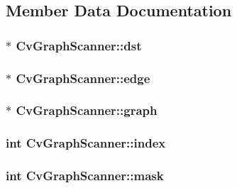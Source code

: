 \subsection{Member Data Documentation}
\hypertarget{structCvGraphScanner_a91bef0ef47bc1f5639bcdf78249633d9}{
\subsubsection[{dst}]{$\ast$ Cv\-Graph\-Scanner\-::dst}}\label{structCvGraphScanner_a91bef0ef47bc1f5639bcdf78249633d9}
\hypertarget{structCvGraphScanner_ab1dda30fae2447a8302717d1ba59cf39}{
\subsubsection[{edge}]{$\ast$ Cv\-Graph\-Scanner\-::edge}}\label{structCvGraphScanner_ab1dda30fae2447a8302717d1ba59cf39}
\hypertarget{structCvGraphScanner_a092119864e858db9dbb77816ded7e436}{
\subsubsection[{graph}]{$\ast$ Cv\-Graph\-Scanner\-::graph}}\label{structCvGraphScanner_a092119864e858db9dbb77816ded7e436}
\hypertarget{structCvGraphScanner_a8942c65f190ecb15983491145c3d01ea}{
\subsubsection[{index}]{\setlength{\rightskip}{0pt plus 5cm}int Cv\-Graph\-Scanner\-::index}}\label{structCvGraphScanner_a8942c65f190ecb15983491145c3d01ea}
\hypertarget{structCvGraphScanner_a95d8158067ea2c81be54de5ca67cb67d}{
\subsubsection[{mask}]{\setlength{\rightskip}{0pt plus 5cm}int Cv\-Graph\-Scanner\-::mask}}\label{structCvGraphScanner_a95d8158067ea2c81be54de5ca67cb67d}
